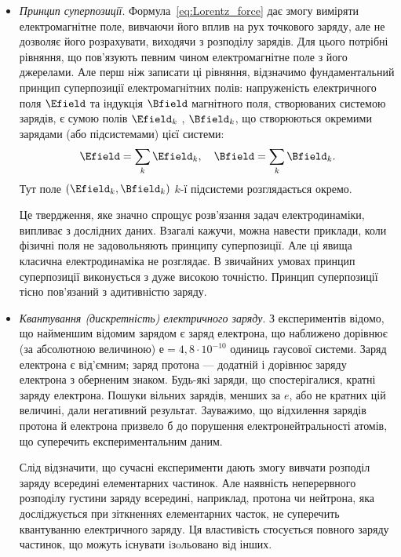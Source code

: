 \begin{itemize}\setlength{\parindent}{2em}

	\item \textit{Принцип суперпозиції}. Формула~\eqref{eq:Lorentz_force} дає змогу виміряти
	      електромагнітне поле, вивчаючи його вплив на рух точкового заряду, але не
	      дозволяє його розрахувати, виходячи з розподілу зарядів. Для цього потрібні
	      рівняння, що пов’язують певним чином електромагнітне поле з його
	      джерелами. Але перш ніж записати ці рівняння, відзначимо фундаментальний
	      принцип суперпозиції електромагнітних полів: напруженість електричного
	      поля $\Efield$ та індукція $\Bfield$ магнітного поля, створюваних системою зарядів, є сумою
	      полів $\Efield_k$ , $\Bfield_k$, що створюються окремими зарядами (або підсистемами) цієї
	      системи:
	      \begin{equation}
		      \Efield = \sum\limits_k \Efield_k, \quad \Bfield = \sum\limits_k \Bfield_k.
	      \end{equation}
	      Тут поле $(\Efield_k, \Bfield_k)$ $k$-ї підсистеми розглядається окремо.


	      Це твердження, яке значно спрощує розв’язання задач електродинаміки,
	      випливає з дослідних даних. Взагалі кажучи, можна навести приклади, коли
	      фізичні поля не задовольняють принципу суперпозиції. Але ці явища класична
	      електродинаміка не розглядає. В звичайних умовах принцип суперпозиції
	      виконується з дуже високою точністю. Принцип суперпозиції тісно пов’язаний
	      з адитивністю заряду.


	\item \textit{Квантування (дискретність) електричного заряду}. З експериментів відомо, що найменшим відомим зарядом є заряд електрона, що наближено дорівнює (за абсолютною величиною) $е=4,8\cdot10^{-10}$ одиниць гаусової системи. Заряд електрона є від’ємним; заряд протона --- додатній і дорівнює заряду електрона з оберненим знаком. Будь-які заряди, що спостерігалися, кратні заряду електрона. Пошуки вільних зарядів, менших за $e$, або не кратних цій величині, дали негативний результат. Зауважимо, що відхилення зарядів протона й електрона призвело б до порушення електронейтральності атомів, що суперечить експериментальним даним.


	      Слід відзначити, що сучасні експерименти дають змогу вивчати розподіл заряду всередині елементарних частинок. Але наявність неперервного розподілу густини заряду всередині, наприклад, протона чи нейтрона, яка досліджується при зіткненнях елементарних часток, не суперечить квантуванню електричного заряду. Ця властивість стосується повного заряду частинок, що можуть існувати iзoльовано від інших.



\end{itemize}
